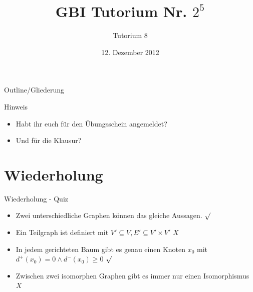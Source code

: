 

\title[Tutorium 8]{GBI Tutorium Nr. $2^5$}
\subtitle{Tutorium 8}
\date{12. Dezember 2012}






	\begin{frame}
		\titlepage
	\end{frame}

	\begin{frame}{Outline/Gliederung}
		\tableofcontents
	\end{frame}
	
	
	\begin{frame}
		\begin{block}{Hinweis}
			\begin{itemize}
				\item Habt ihr euch für den Übungsschein angemeldet?
				\pause
				\item Und für die Klausur?
			\end{itemize}
		\end{block}
	\end{frame}
	
		
	
	
	
	\section{Wiederholung} 
	\begin{frame} {Wiederholung - Quiz}
		\begin{itemize}
			\item Zwei unterschiedliche Graphen können das gleiche Aussagen.
			\only<2-> {\color{darkgreen}$\surd$}\\
			\color{black}
					
			\item Ein Teilgraph ist definiert mit $V' \subseteq V, E' \subseteq V' \times V'$
			\only<3-> {\color{red}$X$}\\
			\color{black}
	
			\item In jedem gerichteten Baum gibt es genau einen Knoten $x_0$ mit
$d^{+}(x_0) = 0 \land d^{−}(x_0) \geq 0$
			\only<4-> {\color{darkgreen}$\surd$}\\
			\color{black}
			
			\item Zwischen zwei isomorphen Graphen gibt es immer nur einen Isomorphismus
			\only<4-> {\color{red}$X$}\\
			\color{black}
		\end{itemize}
	\end{frame}
	

